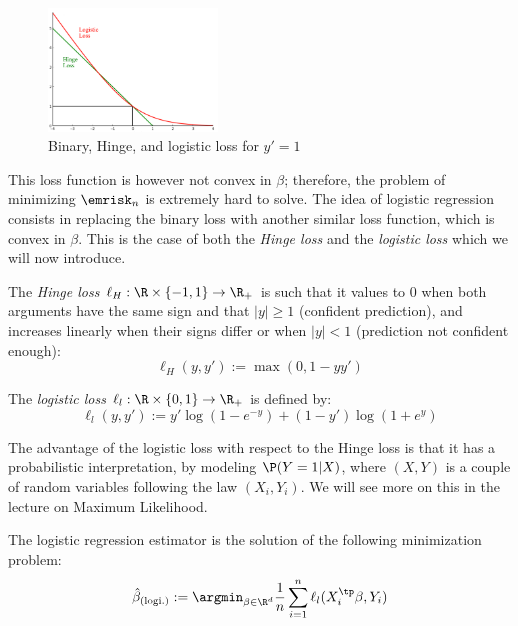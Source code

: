 \documentclass{../cs-classes/cs-classes}
\begin{document}
\begin{figure}
\centering
    \captionsetup{justification=centering}
    \includegraphics[width=0.4\textwidth]{images/losses-graph.png}
    \caption{Binary, Hinge, and logistic loss for $y'=1$}
\end{figure}
This loss function is however not convex in $\beta$; therefore, the problem of minimizing $\emrisk_n$ is extremely hard to solve. 
The idea of logistic regression consists in replacing the binary loss with another similar loss function, which is convex in $\beta$. This is the case of both the \emph{Hinge loss} and the \emph{logistic loss} which we will now introduce.

\begin{definition}
    The \emph{Hinge loss} $\ell_H:\R\times\{-1, 1\}\to\R_+$ is such that it values to $0$ when both arguments have the same sign and that $|y|\geq1$ (confident prediction), and increases linearly when their signs differ or when $|y|<1$ (prediction not confident enough):
    \begin{equation}
        \ell_H(y, y') := \max(0, 1-yy')
    \end{equation}
\end{definition}

\begin{definition}
    The \emph{logistic loss} $\ell_l:\R\times\{0, 1\}\to\R_+$ is defined by:
    \begin{equation}
        \ell_l(y, y') := y'\log(1-e^{-y}) + (1-y')\log(1+e^y)
    \end{equation}
\end{definition}

The advantage of the logistic loss with respect to the Hinge loss is that it has a probabilistic interpretation, by modeling $\P(Y=1|X)$, where $(X, Y)$ is a couple of random variables following the law $(X_i, Y_i)$. We will see more on this in the lecture on Maximum Likelihood.

\begin{definition}
    The logistic regression estimator is the solution of the following minimization problem:
    \begin{equation}
        \hat{\beta}_{\textnormal{(logi.)}} := \argmin_{\beta\in\R^d}\frac{1}{n}\sum_{i=1}^n \ell_l(X^\tp_i\beta, Y_i)
    \end{equation}    
\end{definition}
\end{document}
